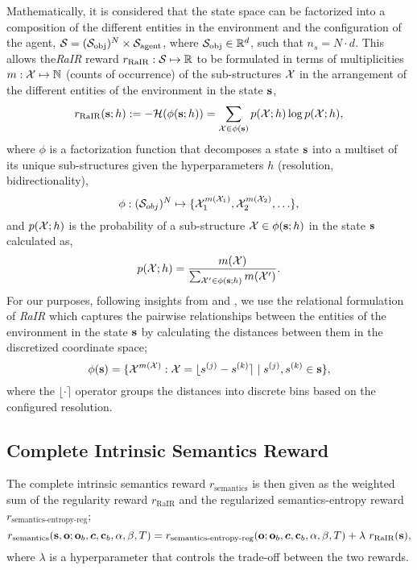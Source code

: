 Mathematically, it is considered that the state space can be factorized into a composition of the different entities in the environment and the configuration of the agent, \(\mathcal{S} = (\mathcal{S}_{\text{obj}})^N \times \mathcal{S}_{\text{agent}}\), where \(\mathcal{S}_{\text{obj}} \in \mathbb{R}^d\), such that \(n_s = N \cdot d\).
This allows the\emph {RaIR} reward \(r_{\text{RaIR}}: \mathcal{S} \mapsto \mathbb{R}\) to be formulated in terms of multiplicities \(m: \mathcal{X} \mapsto \mathbb{N}\) (counts of occurrence) of the sub-structures \(\mathcal{X}\) in the arrangement of the different entities of the environment in the state \(\mathbf{s}\),
\begin{equation}
    \label{eq:rair}
    r_{\text{RaIR}}(\mathbf{s}; h) := -\mathcal{H}(\phi(\mathbf{s}; h)) = \sum_{\mathcal{X} \in \phi(\mathbf{s})} p(\mathcal{X}; h) \log p(\mathcal{X}; h),
\end{equation}
where \(\phi\) is a factorization function that decomposes a state \(\mathbf{s}\) into a multiset of its unique sub-structures given the hyperparameters \(h\) (resolution, bidirectionality),
\begin{equation}
    \label{eq:rair-factorization}
    \phi : (\mathcal{S}_{obj})^{N} \mapsto \{ \mathcal{X}_1^{m(\mathcal{X}_1)}, \mathcal{X}_2^{m(\mathcal{X}_2)}, \ldots \},
\end{equation}
and \(p(\mathcal{X}; h)\) is the probability of a sub-structure \(\mathcal{X} \in \phi(\mathbf{s}; h)\) in the state \(\mathbf{s}\) calculated as,
\begin{equation}
    \label{eq:rair-probability}
    p(\mathcal{X}; h) = \dfrac{m(\mathcal{X})}{\sum_{\mathcal{X}' \in \phi(\mathbf{s}; h)} m(\mathcal{X}')}.
\end{equation}
% 
For our purposes, following insights from \cite{symmetry} and \cite{compositional}, we use the relational formulation of \emph{RaIR} which captures the pairwise relationships between the entities of the environment in the state \(\mathbf{s}\) by calculating the distances between them in the discretized coordinate space;
\begin{equation}
    \label{eq:rair-relational}
    \phi(\mathbf{s}) = \{ \mathcal{X}^{m(\mathcal{X})} : \mathcal{X} = \lfloor s^{(j)} - s^{(k)} \rceil \mid s^{(j)}, s^{(k)} \in \mathbf{s} \},
\end{equation}
where the \(\lfloor \cdot \rceil\) operator groups the distances into discrete bins based on the configured resolution.

\subsection{Complete Intrinsic Semantics Reward}
\label{sec:complete-semantics-reward}
The complete intrinsic semantics reward \(r_{\text{semantics}}\) is then given as the weighted sum of the regularity reward \(r_{\text{RaIR}}\) and the regularized semantics-entropy reward \(r_{\text{semantics-entropy-reg}}\);
\begin{equation}
    \label{eq:semantics-reward}
    r_{\text{semantics}}(\mathbf{s}, \mathbf{o}; \mathbf{o}_b, \bm{c}, \mathbf{c}_b, \alpha, \beta, T) =r_{\text{semantics-entropy-reg}}(\mathbf{o}; \mathbf{o}_b, \bm{c}, \mathbf{c}_b, \alpha, \beta, T) + \lambda\ r_{\text{RaIR}}(\mathbf{s}),
\end{equation}
where \(\lambda\) is a hyperparameter that controls the trade-off between the two rewards.


